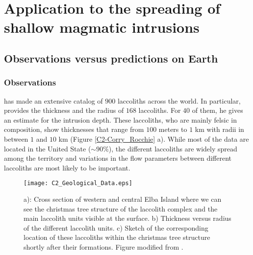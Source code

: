 \section{Application to the spreading of shallow magmatic intrusions}
\label{C2-sec:appl-earth-moon}

\subsection{Observations versus predictions on Earth}
\label{C2-sec:observ-vs-pred}

\subsubsection*{Observations}

\citet{E:2015tl}  has made  an extensive  catalog of  $900$ laccoliths
across  the  world.   In  particular,  \citet{E:2015tl}  provides  the
thickness and  the radius of $168$  laccoliths.  For $40$ of  them, he
gives an estimate for the  intrusion depth.  These laccoliths, who are
mainly felsic in  composition, show thicknesses that  range from $100$
meters  to $1$  km  with radii  in  between $1$  and  $10$ km  (Figure
\ref{C2-Corry_Rocchie} a).  While most of  the data are located in the
United State ($\sim 90\%$), the different laccoliths are widely spread
among  the territory  and variations  in the  flow parameters  between
different laccoliths are most likely to be important.
\begin{figure}[h!]
  \begin{center}
    \graphicspath{ {/Users/thorey/Documents/These/Manuscript/Figure/Chapter2/} }
    \texttt{[image: C2\_Geological\_Data.eps]}
    \caption{a):  Cross section  of  western and  central Elba  Island
      where we can  see the christmas tree structure  of the laccolith
      complex and the main laccolith  units visible at the surface. b)
      Thickness  versus radius  of the  different laccolith  units. c)
      Sketch of the corresponding  location of these laccoliths within
      the    christmas   tree    structure    shortly   after    their
      formations. Figure modified from \citet{Rocchi:2002jy}.}
    \label{C2_Geological_Data}
  \end{center}
\end{figure}

